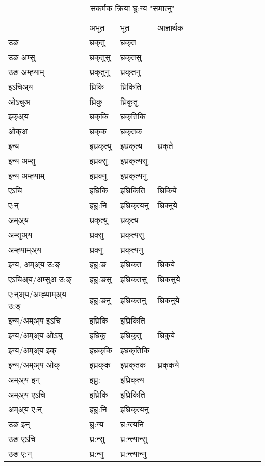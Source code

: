 \begin{table}[H]
\label{ikt.vt} \centering
\caption{सकर्मक क्रिया  घ्रु:न्य  "समात्‍नु"  }
\begin{tabular}{l|l|l|l|l|l|l|l|l|l|l|l|l}  \toprule
&अभूत & भूत & आज्ञार्थक \\ 
उङ &घ्रक्‌तु &घ्रक्‌त \\ 
उङ अम्सु&घ्रक्‌तुसु &घ्रक्‌तसु \\ 
उङ अम्ह्‍याम्&घ्रक्‌तुनु &घ्रक्‌तनु \\ 
इऽचिअ्य &घ्रिकि &घ्रिकिति   \\ 
ओऽचुअ        &घ्रिकु &घ्रिकुतु   \\ 
इक्अ्य&घ्रक्‌कि &घ्रक्‌तिकि   \\ 
ओक्अ &घ्रक्‌क &घ्रक्‌तक   \\ 
इन्य & इघ्रक्‌त्यु  & इघ्रक्‌त्य &घ्रक्‌ते  \\ 
इन्य अम्सु& इघ्रक्सु  & इघ्रक्‌त्यसु   \\ 
इन्य अम्ह्‍याम्& इघ्रक्‍नु  & इघ्रक्‌त्यनु   \\ 
एऽचि & इघ्रिकि & इघ्रिकिति &घ्रिकिये    \\ 
ए:न् & इघ्रु:नि  & इघ्रिक्‌त्यनु &घ्रिक्‍नुये  \\ 
अम्अ्य & घ्रक्‌त्यु  & घ्रक्‌त्य  \\ 
अम्सुअ्य & घ्रक्सु & घ्रक्‌त्यसु  \\ 
अम्ह्‍याम्अ्य & घ्रक्‍नु  & घ्रक्‌त्यनु \\ 
\midrule
इन्य, अम्अ्य उ:ङ्‌ &इघ्रु:ङ &इघ्रिकत &घ्रिकये \\ 
एऽचिअ्य/अम्सुअ उ:ङ्‌ &इघ्रु:ङसु &इघ्रिकतसु &घ्रिकसुये \\ 
ए:न्अ्य/अम्ह्‍याम्अ्य उ:ङ्‌ &इघ्रु:ङनु &इघ्रिकतनु &घ्रिकनुये \\ 
इन्य/अम्अ्य इऽचि &इघ्रिकि &इघ्रिकिति    \\ 
इन्य/अम्अ्य ओऽचु &इघ्रिकु &इघ्रिकुतु  &घ्रिकुये  \\ 
इन्य/अम्अ्य इक् &इघ्रक्‌कि &इघ्रक्‌तिकि   \\ 
इन्य/अम्अ्य ओक् &इघ्रक्‌क &इघ्रक्‌तक  &घ्रक्‌कये  \\ 
अम्अ्य इन् & इघ्रु: & इघ्रिक्‌त्य   \\ 
अम्अ्य एऽचि & इघ्रिकि & इघ्रिकिति    \\ 
अम्अ्य ए:न् & इघ्रु:नि  & इघ्रिक्‌त्यनु  \\ 
\midrule
उङ इन् & घ्रु:न्य  & घ्र:न्त्यनि  \\ 
उङ एऽचि & घ्र:न्सु  & घ्र:न्त्यान्सु   \\ 
उङ ए:न्& घ्र:न्‍नु  & घ्र:न्त्यान्‍नु   \\ 
\bottomrule
\end{tabular}
\end{table}


